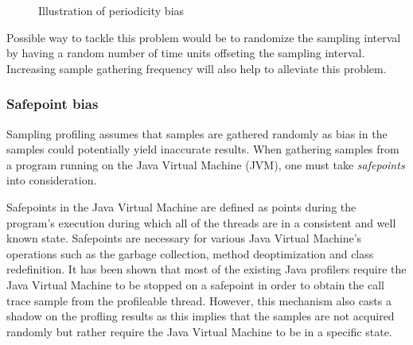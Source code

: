 \documentclass[..thesis.tex]{subfiles}
\begin{document}
\begin{figure}[H]
\centering
{}
\caption{Illustration of periodicity bias}
\label{fig:periodicityBias}
\end{figure}

Possible way to tackle this problem would be to randomize the sampling interval by having a random number of time units offseting the sampling interval. Increasing sample gathering frequency will also help to alleviate this problem.

\subsubsection{Safepoint bias}

Sampling profiling assumes that samples are gathered randomly as bias in the samples could potentially yield inaccurate results. When gathering samples from a program running on the Java Virtual Machine (JVM), one must take \textit{safepoints} into consideration. 

Safepoints in the Java Virtual Machine are defined as points during the program's execution during which all of the threads are in a consistent and well known state. Safepoints are necessary for various Java Virtual Machine's operations such as the garbage collection, method deoptimization and class redefinition.\cite{hotspot_glossary} It has been shown that most of the existing Java profilers require the Java Virtual Machine to be stopped on a safepoint in order to obtain the call trace sample from the profileable thread.\cite{wakart_psychosomatic_2016} However, this mechanism also casts a shadow on the profling results as this implies that the samples are not acquired randomly but rather require the Java Virtual Machine to be in a specific state. \cite{mytkowicz_evaluating_2010}
\end{document}
